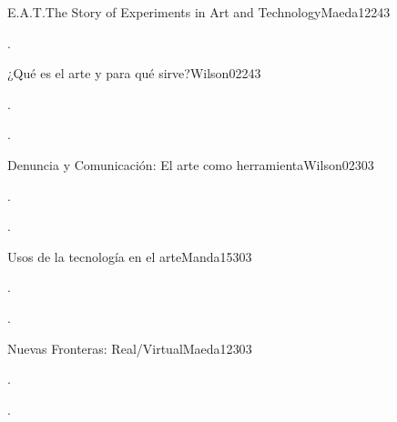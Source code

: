 \begin{syllabus}
\begin{unit}{E.A.T.The Story of Experiments in Art and Technology}{}{Maeda12}{24}{3}
   \begin{learningoutcomes}
      \item .
      \end{learningoutcomes}
\end{unit}

\begin{unit}{¿Qué es el arte y para qué sirve?}{}{Wilson02}{24}{3}
   \begin{topics}
      \item . 
      \end{topics}

   \begin{learningoutcomes}
      \item .
     
   \end{learningoutcomes}
\end{unit}

\begin{unit}{Denuncia y Comunicación: El arte como herramienta}{}{Wilson02}{30}{3}
   \begin{topics}
      \item .
   \end{topics}

   \begin{learningoutcomes}
      \item .
   \end{learningoutcomes}
\end{unit}

\begin{unit}{Usos de la tecnología en el arte}{}{Manda15}{30}{3}
   \begin{topics}
      \item .
   \end{topics}

   \begin{learningoutcomes}
      \item .
   \end{learningoutcomes}
\end{unit}
\begin{unit}{Nuevas Fronteras: Real/Virtual}{}{Maeda12}{30}{3}
   \begin{topics}
      \item .
   \end{topics}

   \begin{learningoutcomes}
      \item .
   \end{learningoutcomes}
\end{unit}


\end{syllabus}
